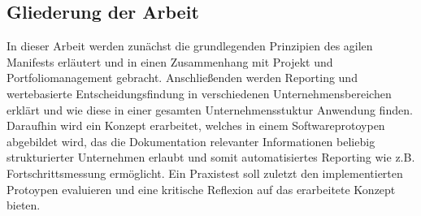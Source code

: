 \subsection{Gliederung der Arbeit}
In dieser Arbeit werden zunächst die grundlegenden Prinzipien des agilen Manifests erläutert und in einen Zusammenhang mit Projekt und Portfoliomanagement gebracht. Anschließenden werden Reporting und wertebasierte Entscheidungsfindung in verschiedenen Unternehmensbereichen erklärt und wie diese in einer gesamten Unternehmensstuktur Anwendung finden. Daraufhin wird ein Konzept erarbeitet, welches in einem Softwareprotoypen abgebildet wird, das die Dokumentation relevanter Informationen beliebig strukturierter Unternehmen erlaubt und somit automatisiertes Reporting wie z.B. Fortschrittsmessung ermöglicht. Ein Praxistest soll zuletzt den implementierten Protoypen evaluieren und eine kritische Reflexion auf das erarbeitete Konzept bieten.